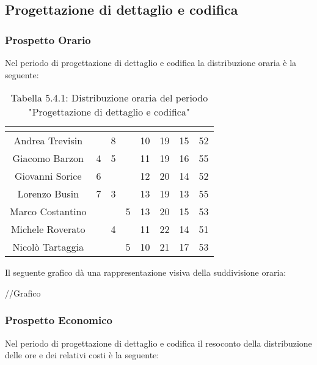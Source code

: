 \subsection{Progettazione di dettaglio e codifica}

\subsubsection{Prospetto Orario}
Nel periodo di progettazione di dettaglio e codifica la distribuzione oraria è la seguente:

\renewcommand{\arraystretch}{1.5}
\begin{table}[H]
\begin{center}
\begin{tabular}{|c|c|c|c|c|c|c|c|}
\hline
\rowcolor{title_row}
\textbf{\color{title_text}{Nome}} & \textbf{\color{title_text}{Resp.}} & \textbf{\color{title_text}{Ammi.}} & \textbf{\color{title_text}{Analist.}} & \textbf{\color{title_text}{Progett.}} & \textbf{\color{title_text}{Program.}} & \textbf{\color{title_text}{Verific.}} & \textbf{\color{title_text}{Totale}} \\ \hline
Andrea Trevisin  & & 8 & & 10 & 19 & 15 & 52  \\ \hline
Giacomo Barzon   & 4 & 5 & & 11 & 19 & 16 & 55 \\ \hline
Giovanni Sorice  & 6 & & & 12 & 20 & 14 & 52  \\ \hline
Lorenzo Busin    & 7 & 3 & & 13 & 19 & 13 & 55  \\ \hline
Marco Costantino & & & 5 & 13 & 20 & 15 & 53 \\ \hline
Michele Roverato & & 4 & & 11 & 22 & 14 & 51  \\ \hline
Nicolò Tartaggia & & & 5 & 10 & 21 & 17 & 53  \\ \hline
\end{tabular}
\caption{Tabella 5.4.1: Distribuzione oraria del periodo "Progettazione di dettaglio e codifica"\label{}}
\end{center}
\end{table}
\renewcommand{\arraystretch}{1}

Il seguente grafico dà una rappresentazione visiva della suddivisione oraria: \\
\begin{center}
//Grafico
\end{center}


\subsubsection{Prospetto Economico}
Nel periodo di progettazione di dettaglio e codifica il resoconto della distribuzione delle ore e dei relativi costi è la seguente:

